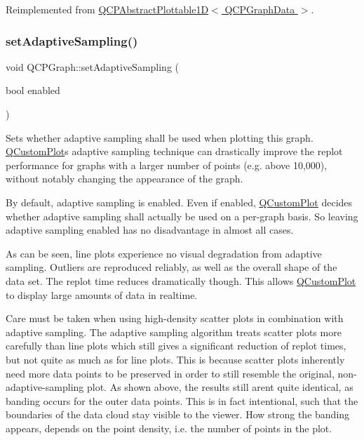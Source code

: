 Reimplemented from \hyperlink{class_q_c_p_abstract_plottable1_d_a071e2df66ba1746067dfcb5e27947b43}{Q\+C\+P\+Abstract\+Plottable1\+D$<$ Q\+C\+P\+Graph\+Data $>$}.

\mbox{\label{class_q_c_p_graph_ab468cd600160f327836aa0644291e64c}} 
\subsubsection{\texorpdfstring{set\+Adaptive\+Sampling()}{setAdaptiveSampling()}}
{\footnotesize\ttfamily void Q\+C\+P\+Graph\+::set\+Adaptive\+Sampling (\begin{DoxyParamCaption}\item[{bool}]{enabled }\end{DoxyParamCaption})}

Sets whether adaptive sampling shall be used when plotting this graph. \hyperlink{class_q_custom_plot}{Q\+Custom\+Plot}\textquotesingle{}s adaptive sampling technique can drastically improve the replot performance for graphs with a larger number of points (e.\+g. above 10,000), without notably changing the appearance of the graph.

By default, adaptive sampling is enabled. Even if enabled, \hyperlink{class_q_custom_plot}{Q\+Custom\+Plot} decides whether adaptive sampling shall actually be used on a per-\/graph basis. So leaving adaptive sampling enabled has no disadvantage in almost all cases.

 As can be seen, line plots experience no visual degradation from adaptive sampling. Outliers are reproduced reliably, as well as the overall shape of the data set. The replot time reduces dramatically though. This allows \hyperlink{class_q_custom_plot}{Q\+Custom\+Plot} to display large amounts of data in realtime.

 Care must be taken when using high-\/density scatter plots in combination with adaptive sampling. The adaptive sampling algorithm treats scatter plots more carefully than line plots which still gives a significant reduction of replot times, but not quite as much as for line plots. This is because scatter plots inherently need more data points to be preserved in order to still resemble the original, non-\/adaptive-\/sampling plot. As shown above, the results still aren\textquotesingle{}t quite identical, as banding occurs for the outer data points. This is in fact intentional, such that the boundaries of the data cloud stay visible to the viewer. How strong the banding appears, depends on the point density, i.\+e. the number of points in the plot.

